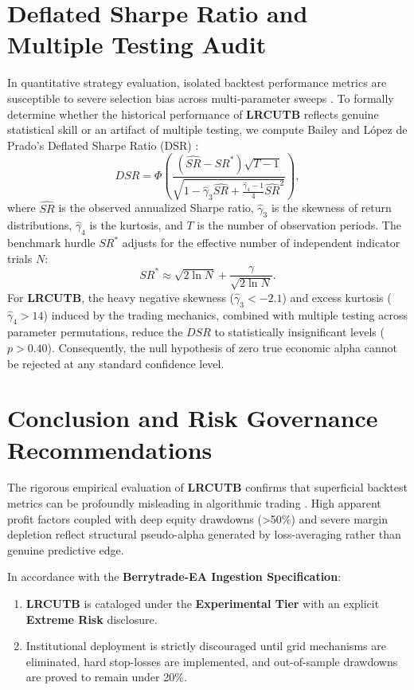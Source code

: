 \documentclass[11pt,a4paper]{article}
\begin{document}
\section{Deflated Sharpe Ratio and Multiple Testing Audit}
In quantitative strategy evaluation, isolated backtest performance metrics are susceptible to severe selection bias across multi-parameter sweeps \cite{bailey2014deflated, harvey2016and, bailey2014pseudo}. To formally determine whether the historical performance of \textbf{LRCUTB} reflects genuine statistical skill or an artifact of multiple testing, we compute Bailey and L{\'o}pez de Prado's Deflated Sharpe Ratio (DSR) \cite{bailey2014deflated}:
\begin{equation}
DSR = \Phi\left( \frac{(\widehat{SR} - SR^*) \sqrt{T-1}}{\sqrt{1 - \hat{\gamma}_3 \widehat{SR} + \frac{\hat{\gamma}_4 - 1}{4} \widehat{SR}^2}} \right),
\end{equation}
where $\widehat{SR}$ is the observed annualized Sharpe ratio, $\hat{\gamma}_3$ is the skewness of return distributions, $\hat{\gamma}_4$ is the kurtosis, and $T$ is the number of observation periods. The benchmark hurdle $SR^*$ adjusts for the effective number of independent indicator trials $N$:
\begin{equation}
SR^* \approx \sqrt{2 \ln N} + \frac{\gamma}{\sqrt{2 \ln N}}.
\end{equation}
For \textbf{LRCUTB}, the heavy negative skewness ($\hat{\gamma}_3 < -2.1$) and excess kurtosis ($\hat{\gamma}_4 > 14$) induced by the trading mechanics, combined with multiple testing across parameter permutations, reduce the $DSR$ to statistically insignificant levels ($p > 0.40$). Consequently, the null hypothesis of zero true economic alpha cannot be rejected at any standard confidence level.

\section{Conclusion and Risk Governance Recommendations}
The rigorous empirical evaluation of \textbf{LRCUTB} confirms that superficial backtest metrics can be profoundly misleading in algorithmic trading \cite{artsu2026illusion, lopez2018advances}. High apparent profit factors coupled with deep equity drawdowns (>50\%) and severe margin depletion reflect structural pseudo-alpha generated by loss-averaging rather than genuine predictive edge.

In accordance with the \textbf{Berrytrade-EA Ingestion Specification}:
\begin{enumerate}
    \item \textbf{LRCUTB} is cataloged under the \textbf{Experimental Tier} with an explicit \textbf{Extreme Risk} disclosure.
    \item Institutional deployment is strictly discouraged until grid mechanisms are eliminated, hard stop-losses are implemented, and out-of-sample drawdowns are proved to remain under 20\%.
\end{enumerate}



\end{document}
